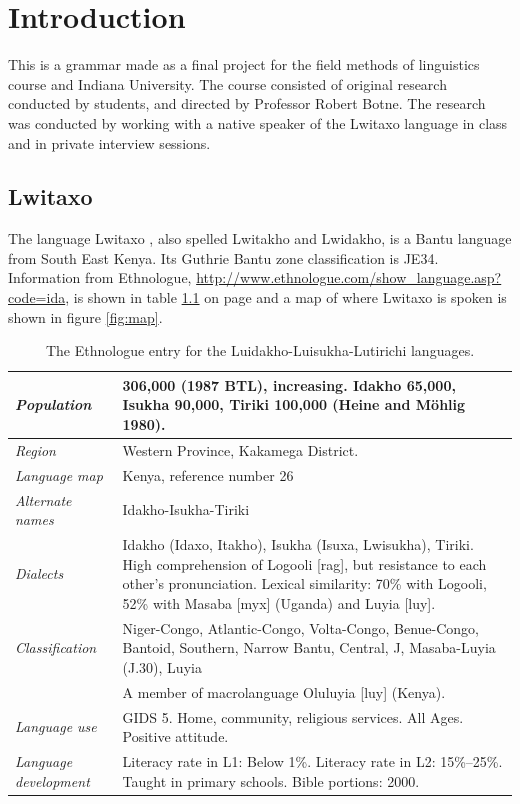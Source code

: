 \chapter{Introduction}
This is a grammar made as a final project for the field methods of linguistics course and Indiana University.  The course consisted of original research conducted by students, and directed by Professor Robert Botne.  The research was conducted by working with a native speaker of the Lwitaxo language in class and in private interview sessions.

\section{Lwitaxo}
The language Lwitaxo , also spelled Lwitakho and Lwidakho, is a Bantu language from South East Kenya.  Its Guthrie Bantu zone classification is JE34.  Information from Ethnologue, \url{http://www.ethnologue.com/show_language.asp?code=ida}, is shown in table \ref{tab:ethnologue} on page \pageref{tab:ethnologue} and a map of where Lwitaxo is spoken is shown in figure \ref{fig:map}.

\begin{table}[p]
  \centering
  \caption{The Ethnologue entry for the Luidakho-Luisukha-Lutirichi languages.}
\begin{tabularx}{\textwidth}{lX}
    \addlinespace
    \toprule
    {\it Population } & 306,000 (1987 BTL), increasing. Idakho 65,000, Isukha 90,000, Tiriki 100,000 (Heine and Möhlig 1980). \\
    \midrule
    {\it Region } & Western Province, Kakamega District. \\
    {\it Language map } & Kenya, reference number 26 \\
    {\it Alternate names  } & Idakho-Isukha-Tiriki \\
    {\it Dialects } & Idakho (Idaxo, Itakho), Isukha (Isuxa, Lwisukha), Tiriki. High comprehension of Logooli [rag], but resistance to each other’s pronunciation. Lexical similarity: 70\% with Logooli, 52\% with Masaba [myx] (Uganda) and Luyia [luy]. \\
    \multicolumn{ 1}{l}{{\it Classification }} & Niger-Congo, Atlantic-Congo, Volta-Congo, Benue-Congo, Bantoid, Southern, Narrow Bantu, Central, J, Masaba-Luyia (J.30), Luyia \\
    \multicolumn{ 1}{l}{{\it }} & A member of macrolanguage Oluluyia [luy] (Kenya). \\
    {\it Language use } & GIDS 5. Home, community, religious services. All Ages. Positive attitude. \\
    {\it Language development } & Literacy rate in L1: Below 1\%. Literacy rate in L2: 15\%–25\%. Taught in primary schools. Bible portions: 2000. \\
    \bottomrule
    \end{tabularx}
  \label{tab:ethnologue}
\end{table}

